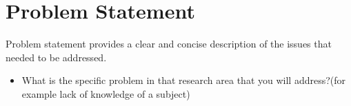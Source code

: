 \section*{Problem Statement}
\label{sec:problemstatement}

Problem statement provides a clear and concise description of the issues that 
needed to be addressed. 
\begin{itemize}
	\item What is the specific problem in that research area that you will 
	address?(for example lack of knowledge of a subject)
\end{itemize}